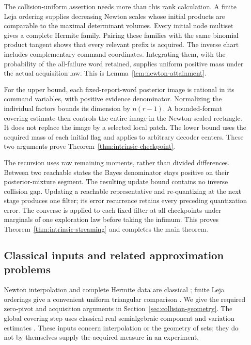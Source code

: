 The collision-uniform assertion needs more than this rank calculation.
A finite Leja ordering supplies decreasing Newton scales whose initial
products are comparable to the maximal determinant volumes. Every
initial node multiset gives a complete Hermite family. Pairing these
families with the same binomial product tangent shows that every
relevant prefix is acquired. The inverse chart includes complementary
command coordinates. Integrating them, with the probability of the
all-failure word retained, supplies uniform positive mass under the
actual acquisition law. This is Lemma~\ref{lem:newton-attainment}.

For the upper bound, each fixed-report-word posterior image is rational
in its command variables, with positive evidence denominator.
Normalizing the individual factors bounds its dimension by $n(r-1)$.
A bounded-format covering estimate then controls the entire image in
the Newton-scaled rectangle. It does not replace the image by a selected
local patch. The lower bound uses the acquired mass of each initial
flag and applies to arbitrary decoder centers. These two arguments
prove Theorem~\ref{thm:intrinsic-checkpoint}.

The recursion uses raw remaining moments, rather than divided
differences. Between two reachable states the Bayes denominator stays
positive on their posterior-mixture segment. The resulting update bound
contains no inverse collision gap. Updating a reachable representative
and re-quantizing at the next stage produces one filter; its error
recurrence retains every preceding quantization error. The converse is
applied to each fixed filter at all checkpoints under marginals of one
exploration law before taking the infimum. This proves
Theorem~\ref{thm:intrinsic-streaming} and completes the main theorem.

\subsection{Classical inputs and related approximation problems}
Newton interpolation and complete Hermite data are classical
\cite{deBoor}; finite Leja orderings give a convenient uniform
triangular comparison \cite{Leja,BosEtAl}. We give the required
zero-pivot and acquisition arguments in
Section~\ref{sec:collision-geometry}. The global covering step uses
classical real semialgebraic component and variation estimates
\cite{YomdinComte,ZhangKileel,ComteHalupczok}. These inputs concern
interpolation or the geometry of sets; they do not by themselves
supply the acquired measure in an experiment.

